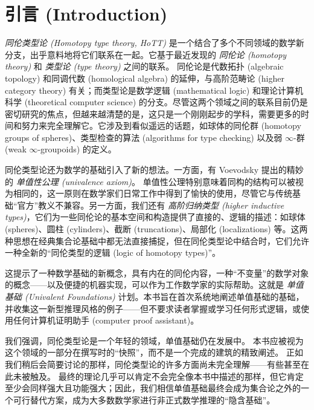 \chapter*{引言 (Introduction)}
\setcounter{page}{1}

\emph{同伦类型论 (Homotopy type theory, HoTT)} 是一个结合了多个不同领域的数学新分支，出乎意料地将它们联系在一起。它基于最近发现的 \emph{同伦论 (homotopy theory)} 和 \emph{类型论 (type theory)} 之间的联系。
同伦论是代数拓扑 (algebraic topology) 和同调代数 (homological algebra) 的延伸，与高阶范畴论 (higher category theory) 有关；而类型论是数学逻辑 (mathematical logic) 和理论计算机科学 (theoretical computer science) 的分支。尽管这两个领域之间的联系目前仍是密切研究的焦点，但越来越清楚的是，这只是一个刚刚起步的学科，需要更多的时间和努力来完全理解它。它涉及到看似遥远的话题，如球体的同伦群 (homotopy groups of spheres)、类型检查的算法 (algorithms for type checking) 以及弱 $\infty$-群 (weak $\infty$-groupoids) 的定义。

同伦类型论还为数学的基础引入了新的想法。一方面，有 Voevodsky 提出的精妙的 \emph{单值性公理 (univalence axiom)}。
单值性公理特别意味着同构的结构可以被视为相同的，这一原则在数学家们日常工作中得到了愉快的使用，尽管它与传统基础“官方”教义不兼容。另一方面，我们还有 \emph{高阶归纳类型 (higher inductive types)}，它们为一些同伦论的基本空间和构造提供了直接的、逻辑的描述：如球体 (spheres)、圆柱 (cylinders)、截断 (truncations)、局部化 (localizations) 等。这两种思想在经典集合论基础中都无法直接捕捉，但在同伦类型论中结合时，它们允许一种全新的“同伦类型的逻辑 (logic of homotopy types)”。

这提示了一种数学基础的新概念，具有内在的同伦内容，一种“不变量”的数学对象的概念——以及便捷的机器实现，可以作为工作数学家的实际帮助。这就是 \emph{单值基础 (Univalent Foundations)} 计划。本书旨在首次系统地阐述单值基础的基础，并收集这一新型推理风格的例子——但不要求读者掌握或学习任何形式逻辑，或使用任何计算机证明助手 (computer proof assistant)。

\OPTwidow

我们强调，同伦类型论是一个年轻的领域，单值基础仍在发展中。
本书应被视为这个领域的一部分在撰写时的“快照”，而不是一个完成的建筑的精致阐述。
正如我们稍后会简要讨论的那样，同伦类型论的许多方面尚未完全理解——有些甚至在此未被触及。
最终的理论几乎可以肯定不会完全像本书中描述的那样，但它肯定至少会同样强大且功能强大；因此，我们相信单值基础最终会成为集合论之外的一个可行替代方案，成为大多数数学家进行非正式数学推理的“隐含基础”。

